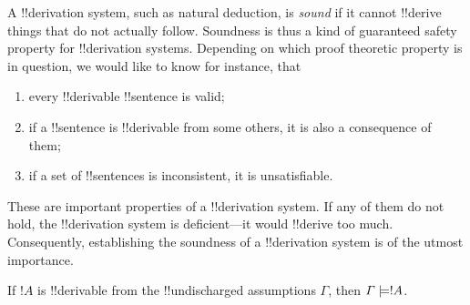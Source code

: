 \documentclass[../../../include/open-logic-section]{subfiles}
\begin{document}

\begin{explain}
A !!{derivation} system, such as natural deduction, is \emph{sound}
if it cannot !!{derive} things that do not actually follow.  Soundness is
thus a kind of guaranteed safety property for !!{derivation} systems.
Depending on which proof theoretic property is in question, we would
like to know for instance, that
\begin{enumerate}
\item every !!{derivable} !!{sentence} is valid;
\item if a !!{sentence} is !!{derivable} from some others, it is also a
  consequence of them;
\item if a set of !!{sentence}s is inconsistent, it is unsatisfiable.
\end{enumerate}
These are important properties of a !!{derivation} system. If any of
them do not hold, the !!{derivation} system is deficient---it would
!!{derive} too much.  Consequently, establishing the soundness of a
!!{derivation} system is of the utmost importance.
\end{explain}

\begin{thm}[Soundness]
If $!A$ is !!{derivable} from the !!{undischarged} assumptions
$\Gamma$, then $\Gamma \Entails !A$.
\end{thm}
\end{document}
